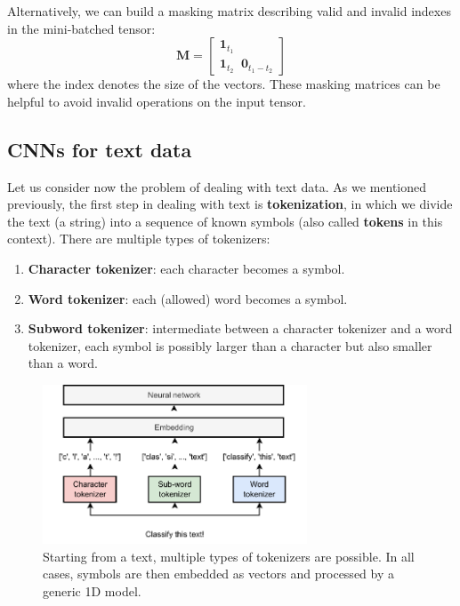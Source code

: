 Alternatively, we can build a masking matrix describing valid and invalid indexes in the mini-batched tensor:
%
$$
\mathbf{M}=\begin{bmatrix} \mathbf{1}_{t_1} \\ \mathbf{1}_{t_2} \;\;\mathbf{0}_{t_1-t_2} \end{bmatrix}
$$
%
where the index denotes the size of the vectors. These masking matrices can be helpful to avoid invalid operations on the input tensor.

\subsection{CNNs for text data}

Let us consider now the problem of dealing with text data. As we mentioned previously, the first step in dealing with text is \textbf{tokenization}, in which we divide the text (a string) into a sequence of known symbols (also called \textbf{tokens} in this context). There are multiple types of tokenizers:
%
\begin{enumerate}
\item \textbf{Character tokenizer}: each character becomes a symbol.
\item \textbf{Word tokenizer}: each (allowed) word becomes a symbol.
\item \textbf{Subword tokenizer}: intermediate between a character tokenizer and a word tokenizer, each symbol is possibly larger than a character but also smaller than a word.
\end{enumerate}

\begin{figure}
    \centering
    \includegraphics[width=0.7\textwidth]{images/text_tokenization}
    \caption{Starting from a text, multiple types of tokenizers are possible. In all cases, symbols are then embedded as vectors and processed by a generic 1D model.}
    \label{fig:text_tokenization}
\end{figure}

